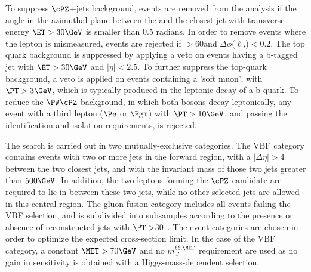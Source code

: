 To suppress $\cPZ$+jets background, events are removed from the analysis if the angle in the azimuthal plane between
the \MET and the closest jet with transverse energy $\ET > 30\GeV$ is smaller than 0.5 radians. In order to remove events where the lepton is mismeasured, events are rejected if \MET$>$60\GeV and $\Delta\phi$($\ell$,\MET)$<0.2$. The top quark background is suppressed by applying a veto on events having a b-tagged jet with $\ET > 30\GeV$ and $|\eta| < 2.5$.
To further suppress the top-quark background, a veto is applied on events containing a 'soft muon', with $\PT > 3\GeV$, which is typically produced in the leptonic decay of a b quark. To reduce the $\PW\cPZ$ background, in which both bosons
decay leptonically, any event with a third lepton ($\Pe$ or $\Pgm$) with $\PT > 10\GeV$, and passing the identification and
isolation requirements, is rejected.

The search is carried out in two mutually-exclusive categories. The VBF category contains events with two or more jets
in the forward region, with a $|\Delta\eta|>4$ between the two closest jets, and with the invariant mass of those two
jets greater than $500\GeV$. In addition, the two leptons forming the $\cPZ$ candidate are required to lie in between
these two jets, while no other selected jets are allowed in this central region. The gluon fusion category includes all events failing the VBF selection, and is subdivided into subsamples according to the presence or absence of
reconstructed jets with $\PT>$30~\GeV. The event categories are chosen in order to optimize the expected cross-section
limit. In the case of the VBF category, a constant $\MET>70\GeV$ and no $m_\mathrm{T}^{\ell\ell,\MET}$ requirement are used as no gain in sensitivity is obtained with a Higgs-mass-dependent selection.




